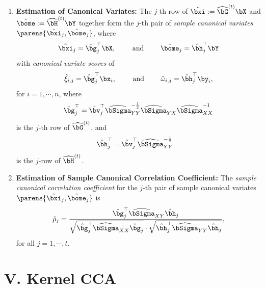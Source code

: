 \documentclass[12pt]{article}
\begin{document}
\begin{enumerate}[label=\textbf{\arabic*.}]
	\item \textbf{Estimation of Canonical Variates:} The $j$-th row of $\hat{\bxi} := \widehat{\bG}^{(t)} \bX$ and $\hat{\bome} := \widehat{\bH}^{(t)} \bY$ together form the $j$-th pair of \textit{sample canonical variates} $\parens{\hat{\bxi}_j, \hat{\bome}_j}$, where 
	\begin{align}
		\hat{\bxi}_j = \hat{\bg}_j^\top \bX, \qquad \text{ and } \qquad \hat{\bome}_j = \hat{\bh}_j^\top \bY
	\end{align}
	with \textit{canonical variate scores} of 
	\begin{align}
		\hat{\xi}_{i,j} = \hat{\bg}_j^\top \bx_i, \qquad \text{ and } \qquad \hat{\omega}_{i,j} = \hat{\bh}_j^\top \by_i, 
	\end{align}
	for $i = 1, \cdots, n$, where 
	\begin{align}
		\hat{\bg}_j^\top = \hat{\bv}_j^\top \widehat{\bSigma}_{YY}^{-\frac{1}{2}} \widehat{\bSigma}_{YX} \widehat{\bSigma}_{XX}^{-1}
	\end{align}
	is the $j$-th row of $\widehat{\bG}^{(t)}$, and 
	\begin{align}
		\hat{\bh}_j^\top = & \, \hat{\bv}_j^\top \widehat{\bSigma}_{YY}^{-\frac{1}{2}}
	\end{align}
	is the $j$-row of $\widehat{\bH}^{(t)}$. 
	
	\item \textbf{Estimation of Sample Canonical Correlation Coefficient:} The \textit{sample canonical correlation coefficient} for the $j$-th pair of sample canonical variates $\parens{\hat{\bxi}_j, \hat{\bome}_j}$ is 
	\begin{align}
		\hat{\rho}_j = \frac{\hat{\bg}_j^\top \widehat{\bSigma}_{XY} \hat{\bh}_j}{\sqrt{\hat{\bg}_j^\top \widehat{\bSigma}_{XX} \hat{\bg}_j} \cdot \sqrt{\hat{\bh}_j^\top \widehat{\bSigma}_{YY} \hat{\bh}_j}}, 
	\end{align}
	for all $j = 1, \cdots, t$. 
	
\end{enumerate}


\section*{V. Kernel CCA}
\end{document}
